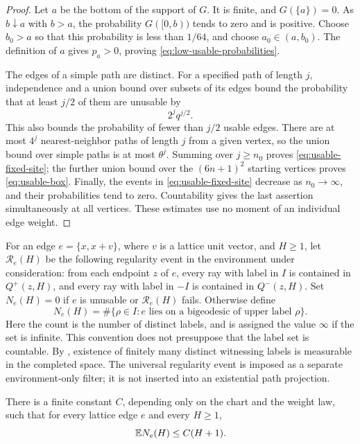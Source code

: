 \begin{proof}
Let $a$ be the bottom of the support of $G$.  It is finite, and
$G(\{a\})=0$.  As $b\downarrow a$ with $b>a$, the probability
$G([0,b))$ tends to zero and is positive.  Choose $b_0>a$ so that this
probability is less than $1/64$, and choose $a_0\in(a,b_0)$.
The definition of $a$ gives $p_a>0$, proving
\eqref{eq:low-usable-probabilities}.

The edges of a simple path are distinct.  For a specified path of length
$j$, independence and a union bound over subsets of its edges bound the
probability that at least $j/2$ of them are unusable by
\[
 2^j q^{j/2}.
\]
This also bounds the probability of fewer than $j/2$ usable edges.
There are at most $4^j$ nearest-neighbor paths of length $j$ from a given
vertex, so the union bound over simple paths is at most $\theta^j$.
Summing over $j\ge n_0$ proves \eqref{eq:usable-fixed-site}; the further
union bound over the $(6n+1)^2$ starting vertices proves
\eqref{eq:usable-box}.  Finally, the events in
\eqref{eq:usable-fixed-site} decrease as $n_0\to\infty$, and their
probabilities tend to zero.  Countability gives the last assertion
simultaneously at all vertices.  These estimates use no moment of an
individual edge weight.
\end{proof}

For an edge $e=\{x,x+v\}$, where $v$ is a lattice unit vector, and
$H\ge1$, let $\mathcal R_e(H)$ be the following regularity event in the
environment under consideration: from each endpoint $z$ of $e$, every
ray with label in $I$ is contained in $Q^+(z,H)$, and every ray with label
in $-I$ is contained in $Q^-(z,H)$.  Set $N_e(H)=0$ if $e$ is unusable
or $\mathcal R_e(H)$ fails.  Otherwise define
\begin{equation}\label{eq:edge-label-count-definition}
 N_e(H)=\#\{\rho\in I:\text{$e$ lies on a bigeodesic of upper label $\rho$}\}.
\end{equation}
Here the count is the number of distinct labels, and is assigned the
value $\infty$ if the set is infinite.  This convention does not
presuppose that the label set is countable.  By ,
existence of finitely many distinct witnessing labels is measurable in
the completed space.  The universal regularity event is imposed as a
separate environment-only filter; it is not inserted into an
existential path projection.

\begin{proposition}\label{prop:edge-count}
There is a finite constant $C$, depending only on the chart and the weight
law, such that for every lattice edge $e$ and every $H\ge1$,
\begin{equation}\label{eq:edge-label-count}
 \mathbb E N_e(H)\le C(H+1).
\end{equation}
\end{proposition}

